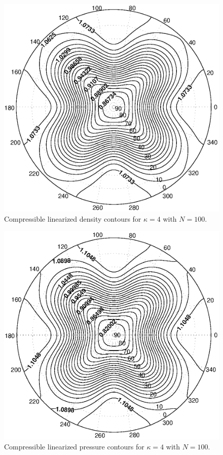 \begin{figure}[htbp]
	\centering
		\includegraphics[scale=0.80]{IMAGES/swrhocontscomp.eps}
	\caption{Compressible linearized density contours for $\kappa=4$ with $N=100$.}
	\label{fig:swrhocontscomp}
\end{figure}

\begin{figure}[htbp]
	\centering
		\includegraphics[scale=0.75]{IMAGES/swpcontscomp.eps}
	\caption{Compressible linearized pressure contours for $\kappa=4$ with $N=100$.}
	\label{fig:swpcontscomp}
\end{figure}

